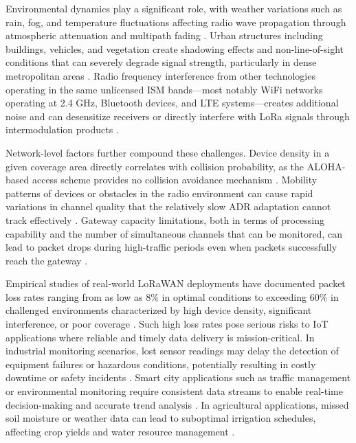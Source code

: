 \documentclass[12pt,a4paper]{article}
\begin{document}
Environmental dynamics play a significant role, with weather variations such as rain, fog, and temperature fluctuations affecting radio wave propagation through atmospheric attenuation and multipath fading \cite{petajajarvi2015performance}. Urban structures including buildings, vehicles, and vegetation create shadowing effects and non-line-of-sight conditions that can severely degrade signal strength, particularly in dense metropolitan areas \cite{liando2018real}. Radio frequency interference from other technologies operating in the same unlicensed ISM bands—most notably WiFi networks operating at 2.4 GHz, Bluetooth devices, and LTE systems—creates additional noise and can desensitize receivers or directly interfere with LoRa signals through intermodulation products \cite{croce2018impact}.

Network-level factors further compound these challenges. Device density in a given coverage area directly correlates with collision probability, as the ALOHA-based access scheme provides no collision avoidance mechanism \cite{bankov2016mathematical}. Mobility patterns of devices or obstacles in the radio environment can cause rapid variations in channel quality that the relatively slow ADR adaptation cannot track effectively \cite{cattani2017experimental}. Gateway capacity limitations, both in terms of processing capability and the number of simultaneous channels that can be monitored, can lead to packet drops during high-traffic periods even when packets successfully reach the gateway \cite{voigt2017mitigating}.

Empirical studies of real-world LoRaWAN deployments have documented packet loss rates ranging from as low as 8\% in optimal conditions to exceeding 60\% in challenged environments characterized by high device density, significant interference, or poor coverage \cite{MachineQ2025_LoRaWAN_Reliability, wixted2016evaluation}. Such high loss rates pose serious risks to IoT applications where reliable and timely data delivery is mission-critical. In industrial monitoring scenarios, lost sensor readings may delay the detection of equipment failures or hazardous conditions, potentially resulting in costly downtime or safety incidents \cite{abrardo2019optimization}. Smart city applications such as traffic management or environmental monitoring require consistent data streams to enable real-time decision-making and accurate trend analysis \cite{sanchez2020state}. In agricultural applications, missed soil moisture or weather data can lead to suboptimal irrigation schedules, affecting crop yields and water resource management \cite{ayoub2019internet}.
\end{document}
